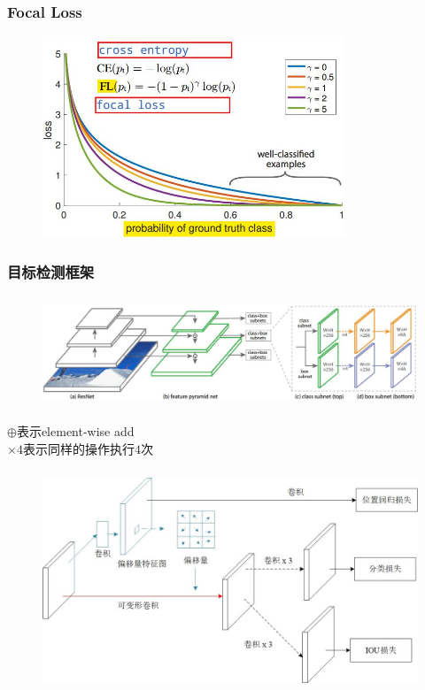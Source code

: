 \documentclass{beamer}
\begin{document}
        \begin{frame}
            \frametitle{Focal Loss}
            \begin{figure}
                \includegraphics[height=6cm]{../graphic/focalloss.jpg}
            \end{figure}
        \end{frame}

        \begin{frame}
            \frametitle{目标检测框架}
            \begin{figure}
                \hspace*{-1.1cm}
                \includegraphics[height=3.3cm]{../graphic/retinanet.jpg}
            \end{figure}
            \vspace{0.2cm}
            $\oplus$表示element-wise add \\
            \vspace{0.3cm}
            $\times 4$表示同样的操作执行$4$次
         \end{frame}

         \begin{frame}
            \begin{figure}
                \hspace*{-0.8cm}
                \includegraphics[height=6.6cm]{../graphic/dfFace2.jpg}
            \end{figure}
         \end{frame}
    
\end{document}
